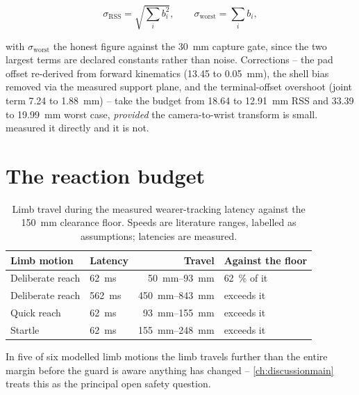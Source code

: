 \begin{equation}
  \sigma_{\text{RSS}} = \sqrt{\textstyle\sum_i b_i^2}, \qquad
  \sigma_{\text{worst}} = \textstyle\sum_i b_i,
  \label{eq:budget}
\end{equation}

with $\sigma_{\text{worst}}$ the honest figure against the
\SI{30}{\milli\metre} capture gate, since the two largest terms are declared
constants rather than noise. Corrections -- the pad offset re-derived from
forward kinematics (\SI{13.45}{} to \SI{0.05}{\milli\metre}), the shell bias
removed via the measured support plane, and the terminal-offset overshoot
(joint term \SI{7.24}{} to \SI{1.88}{\milli\metre}) -- take the budget from
\SI{18.64}{} to \SI{12.91}{\milli\metre} RSS and \SI{33.39}{} to
\SI{19.99}{\milli\metre} worst case, \emph{provided} the camera-to-wrist
transform is small.  measured it directly and it
is not.

\section{The reaction budget}

\begin{table}[htbp]
  \centering
  \caption[Reaction budget]{Limb travel during the measured wearer-tracking
  latency against the \SI{150}{\milli\metre} clearance floor. Speeds are
  literature ranges, labelled as assumptions; latencies are measured.}
  \label{tab:reaction}
  \begin{tabular}{@{}llrl@{}}
    \toprule
    Limb motion & Latency & Travel & Against the floor \\
    \midrule
    Deliberate reach & \SI{62}{\milli\second} & \SIrange{50}{93}{\milli\metre} & \SI{62}{\percent} of it \\
    Deliberate reach & \SI{562}{\milli\second} & \SIrange{450}{843}{\milli\metre} & exceeds it \\
    Quick reach & \SI{62}{\milli\second} & \SIrange{93}{155}{\milli\metre} & exceeds it \\
    Startle & \SI{62}{\milli\second} & \SIrange{155}{248}{\milli\metre} & exceeds it \\
    \bottomrule
  \end{tabular}
\end{table}

In five of six modelled limb motions the limb travels further than the
entire margin before the guard is aware anything has changed --
\cref{ch:discussionmain} treats this as the principal open safety question.
